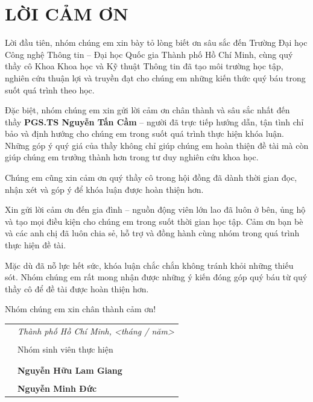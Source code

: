 \chapter*{LỜI CẢM ƠN}
\vspace*{1.5ex}

Lời đầu tiên, nhóm chúng em xin bày tỏ lòng biết ơn sâu sắc đến Trường Đại học Công nghệ Thông tin -- Đại học Quốc gia Thành phố Hồ Chí Minh, cùng quý thầy cô Khoa Khoa học và Kỹ thuật Thông tin đã tạo môi trường học tập, nghiên cứu thuận lợi và truyền đạt cho chúng em những kiến thức quý báu trong suốt quá trình theo học.

Đặc biệt, nhóm chúng em xin gửi lời cảm ơn chân thành và sâu sắc nhất đến thầy \textbf{PGS.TS Nguyễn Tấn Cầm} -- người đã trực tiếp hướng dẫn, tận tình chỉ bảo và định hướng cho chúng em trong suốt quá trình thực hiện khóa luận. Những góp ý quý giá của thầy không chỉ giúp chúng em hoàn thiện đề tài mà còn giúp chúng em trưởng thành hơn trong tư duy nghiên cứu khoa học.

Chúng em cũng xin cảm ơn quý thầy cô trong hội đồng đã dành thời gian đọc, nhận xét và góp ý để khóa luận được hoàn thiện hơn.

Xin gửi lời cảm ơn đến gia đình -- nguồn động viên lớn lao đã luôn ở bên, ủng hộ và tạo mọi điều kiện cho chúng em trong suốt thời gian học tập. Cảm ơn bạn bè và các anh chị đã luôn chia sẻ, hỗ trợ và đồng hành cùng nhóm trong quá trình thực hiện đề tài.

Mặc dù đã nỗ lực hết sức, khóa luận chắc chắn không tránh khỏi những thiếu sót. Nhóm chúng em rất mong nhận được những ý kiến đóng góp quý báu từ quý thầy cô để đề tài được hoàn thiện hơn.

Nhóm chúng em xin chân thành cảm ơn!

{
\begin{table}[ht]
\centering
\begin{tabular}{>{\centering}m{}>{\centering\arraybackslash}m{}}
 & \textit{Thành phố Hồ Chí Minh, <tháng / năm>} \\ & \\
 & Nhóm sinh viên thực hiện \\
 & \\ &  \\
 & \textbf{Nguyễn Hữu Lam Giang} \\
 & \\
 & \textbf{Nguyễn Minh Đức}
\end{tabular}
\end{table}
}
